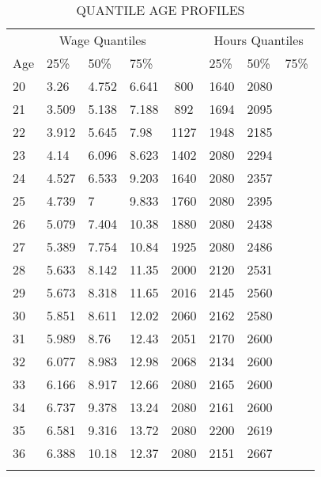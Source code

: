 
%
\begin{center}
  \hypertarget{QuantileAgeProfiles}{}
  \begin{table}
  \centering
    \caption{ \label{tab:QuantileAgeProfiles} \\
      \scriptsize QUANTILE AGE PROFILES}
  \begin{tabular}{l l l l c l l l}
    \hline%
{} & \multicolumn{3}{c}{Wage Quantiles} &{} &  \multicolumn{3}{c}{Hours Quantiles}\\ \cline{2-4} \cline{6-8}
Age & 25\% & 50\%  & 75\% &  {} & 25\% & 50\%  & 75\%  \\ \hline
        20 & 3.26 & 4.752 & 6.641 & 800 & 1640 & 2080 \\
        21 & 3.509 & 5.138 & 7.188 & 892 & 1694 & 2095 \\ 
        22 & 3.912 & 5.645 & 7.98 & 1127 & 1948 & 2185 \\ 
        23 & 4.14 & 6.096 & 8.623 & 1402 & 2080 & 2294 \\ 
        24 & 4.527 & 6.533 & 9.203 & 1640 & 2080 & 2357 \\ 
        25 & 4.739 & 7 & 9.833 & 1760 & 2080 & 2395 \\
        26 & 5.079 & 7.404 & 10.38 & 1880 & 2080 & 2438 \\ 
        27 & 5.389 & 7.754 & 10.84 & 1925 & 2080 & 2486 \\ 
        28 & 5.633 & 8.142 & 11.35 & 2000 & 2120 & 2531 \\
        29 & 5.673 & 8.318 & 11.65 & 2016 & 2145 & 2560 \\ 
        30 & 5.851 & 8.611 & 12.02 & 2060 & 2162 & 2580 \\
        31 & 5.989 & 8.76 & 12.43 & 2051 & 2170 & 2600 \\ 
        32 & 6.077 & 8.983 & 12.98 & 2068 & 2134 & 2600 \\ 
        33 & 6.166 & 8.917 & 12.66 & 2080 & 2165 & 2600 \\ 
        34 & 6.737 & 9.378 & 13.24 & 2080 & 2161 & 2600 \\ 
        35 & 6.581 & 9.316 & 13.72 & 2080 & 2200 & 2619 \\ 
        36 & 6.388 & 10.18 & 12.37 & 2080 & 2151 & 2667 \\ 
\\ \hline
  \end{tabular}
  \end{table}
\end{center}

